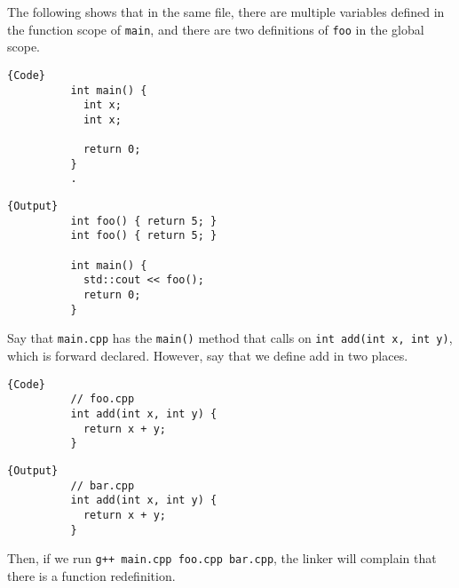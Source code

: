 \documentclass{article}
\begin{document}
    \begin{example} 
      The following shows that in the same file, there are multiple variables defined in the function scope of \texttt{main}, and there are two definitions of \texttt{foo} in the global scope. 
      
      \noindent\begin{minipage}{.5\textwidth}
        \begin{lstlisting}[]{Code}
          int main() {
            int x; 
            int x;

            return 0;
          } 
          .
        \end{lstlisting}
        \end{minipage}
        \hfill
        \begin{minipage}{.49\textwidth}
        \begin{lstlisting}[]{Output}
          int foo() { return 5; }
          int foo() { return 5; }

          int main() {
            std::cout << foo();
            return 0;
          } 
        \end{lstlisting}
      \end{minipage}
    \end{example}

    \begin{example}
      Say that \texttt{main.cpp} has the \texttt{main()} method that calls on \texttt{int add(int x, int y)}, which is forward declared. However, say that we define add in two places. 

      \noindent\begin{minipage}{.5\textwidth}
        \begin{lstlisting}[]{Code}
          // foo.cpp 
          int add(int x, int y) {
            return x + y; 
          }
        \end{lstlisting}
        \end{minipage}
        \hfill
        \begin{minipage}{.49\textwidth}
        \begin{lstlisting}[]{Output}
          // bar.cpp 
          int add(int x, int y) {
            return x + y; 
          }
        \end{lstlisting}
      \end{minipage}
      Then, if we run \texttt{g++ main.cpp foo.cpp bar.cpp}, the linker will complain that there is a function redefinition. 
    \end{example}
\end{document}
